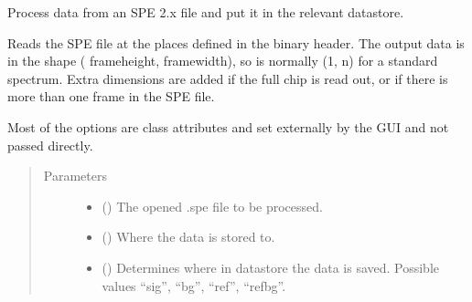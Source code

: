 \documentclass[a4paper,10pt,english]{sphinxmanual}
\begin{document}
\begin{fulllineitems}
\begin{fulllineitems}
\begin{quote}
\begin{description}
\begin{itemize}
\end{itemize}

\end{description}\end{quote}

\end{fulllineitems}


\begin{fulllineitems}
\label{\detokenize{sfgtools:sfgtools.SFGProcessTools.process_spe2x}}
\sphinxAtStartPar
Process data from an SPE 2.x file and put it in the relevant datastore.

\sphinxAtStartPar
Reads the SPE file at the places defined in the binary header. The output data is in the shape (
frameheight, framewidth), so is normally (1, n) for a standard spectrum. Extra dimensions are added
if the full chip is read out, or if there is more than one frame in the SPE file.

\sphinxAtStartPar
{}
Most of the options are class attributes and set externally by the GUI and not passed directly.
\begin{quote}\begin{description}
\item[{Parameters}] \leavevmode\begin{itemize}
\item {} 
\sphinxAtStartPar
{} () \textendash{} The opened .spe file to be processed.

\item {} 
\sphinxAtStartPar
{} () \textendash{} Where the data is stored to.

\item {} 
\sphinxAtStartPar
{} () \textendash{} Determines where in datastore the data is saved. Possible values “sig”, “bg”, “ref”, “refbg”.


\end{itemize}
\end{description}
\end{quote}
\end{fulllineitems}
\end{fulllineitems}
\end{document}
